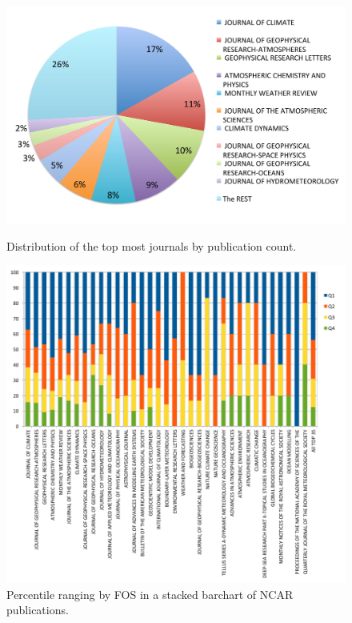 \documentclass[10pt, conference, compsocconf]{IEEEtran}
\begin{document}
\begin{figure}[h!] 
  \centering 
    \includegraphics[width=0.75\columnwidth]{images-new/ncar-a.pdf} 
  \caption{Distribution of the top most journals by publication count.}\label{F:ncar-distribution} 

  \centering 
    \includegraphics[width=1.0\columnwidth]{images-new/ncar-b.pdf} 
  \caption{Percentile ranging by FOS in a stacked barchart of NCAR publications.}\label{F:ncar-stacked-b} 


\end{figure}
\end{document}
